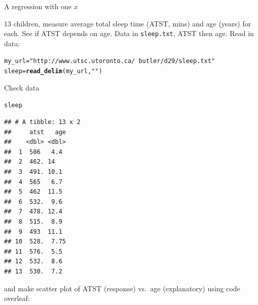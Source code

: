 \documentclass[unknownkeysallowed]{beamer}\usepackage[]{graphicx}\usepackage[]{color}
\makeatletter
\newcommand{\hlstr}[1]{\textcolor[rgb]{0.192,0.494,0.8}{#1}}%
\newcommand{\hlstd}[1]{\textcolor[rgb]{0.345,0.345,0.345}{#1}}%
\newcommand{\hlkwb}[1]{\textcolor[rgb]{0.69,0.353,0.396}{#1}}%
\newcommand{\hlkwd}[1]{\textcolor[rgb]{0.737,0.353,0.396}{\textbf{#1}}}%
\newenvironment{kframe}{%
 \def\at@end@of@kframe{}%
 \ifinner\ifhmode%
  \def\at@end@of@kframe{\end{minipage}}%
  \begin{minipage}{\columnwidth}%
 \fi\fi%
 \def\FrameCommand##1{\hskip\@totalleftmargin \hskip-\fboxsep
 \colorbox{shadecolor}{##1}\hskip-\fboxsep
     \hskip-\linewidth \hskip-\@totalleftmargin \hskip\columnwidth}%
 \MakeFramed {\advance\hsize-\width
   \@totalleftmargin\z@ \linewidth\hsize
   \@setminipage}}%
 {\par\unskip\endMakeFramed%
 \at@end@of@kframe}
\newenvironment{knitrout}{}{} %
\makeatother
\begin{document}
\begin{frame}[fragile]{A regression with one $x$}

13 children, measure average total sleep time (ATST, mins) and age (years) for each. See if ATST depends on age. Data in \verb-sleep.txt-, ATST then age. Read in data:

 
\begin{knitrout}
\color{fgcolor}\begin{kframe}
\begin{alltt}
\hlstd{my_url}\hlkwb{=}\hlstr{"http://www.utsc.utoronto.ca/~butler/d29/sleep.txt"}
\hlstd{sleep}\hlkwb{=}\hlkwd{read_delim}\hlstd{(my_url,}\hlstr{" "}\hlstd{)}
\end{alltt}


{\ttfamily\noindent\itshape\color{messagecolor}{\#\# Parsed with column specification:\\\#\# cols(\\\#\#\ \  atst = col\_double(),\\\#\#\ \  age = col\_double()\\\#\# )}}\end{kframe}
\end{knitrout}


 


\end{frame}

\begin{frame}[fragile]{Check data}
  
\begin{knitrout}\footnotesize
{}\color{fgcolor}\begin{kframe}
\begin{alltt}
\hlstd{sleep}
\end{alltt}
\begin{verbatim}
## # A tibble: 13 x 2
##     atst   age
##    <dbl> <dbl>
##  1  586   4.4 
##  2  462. 14   
##  3  491. 10.1 
##  4  565   6.7 
##  5  462  11.5 
##  6  532.  9.6 
##  7  478. 12.4 
##  8  515.  8.9 
##  9  493  11.1 
## 10  528.  7.75
## 11  576.  5.5 
## 12  532.  8.6 
## 13  530.  7.2
\end{verbatim}
\end{kframe}
\end{knitrout}

and make scatter plot of ATST (response) vs.\ age (explanatory) using
code overleaf:

\end{frame}
\end{document}
